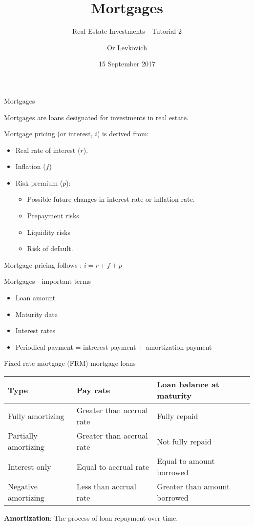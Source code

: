 \documentclass[ignorenonframetext,]{beamer}
\title{Mortgages}
\subtitle{Real-Estate Investments - Tutorial 2}
\author{Or Levkovich}
\date{15 September 2017}
\providecommand{\tightlist}{%
\setlength{\itemsep}{0pt}\setlength{\parskip}{0pt}}
\begin{document}
\frame{\titlepage}

\begin{frame}{Mortgages}

Mortgages are loans designated for investments in real estate.

Mortgage pricing (or interest, \(i\)) is derived from:

\begin{itemize}
\tightlist
\item
  Real rate of interest (\(r\)).
\item
  Inflation (\(f\))
\item
  Risk premium (\(p\)):

  \begin{itemize}
  \tightlist
  \item
    Possible future changes in interest rate or inflation rate.
  \item
    Prepayment risks.
  \item
    Liquidity risks
  \item
    Risk of default.
  \end{itemize}
\end{itemize}

Mortgage pricing follows : \(i = r + f + p\)

\end{frame}

\begin{frame}{Mortgages - important terms}

\begin{itemize}
\tightlist
\item
  Loan amount
\item
  Maturity date
\item
  Interest rates
\item
  Periodical payment = intrerest payment + amortization payment
\end{itemize}

\end{frame}

\begin{frame}{Fixed rate mortgage (FRM) mortgage loans}

\footnotesize

\begin{longtable}[]{@{}lll@{}}
\toprule
Type & Pay rate & Loan balance at maturity\tabularnewline
\midrule
\endhead
Fully amortizing & Greater than accrual rate & Fully
repaid\tabularnewline
Partially amortizing & Greater than accrual rate & Not fully
repaid\tabularnewline
Interest only & Equal to accrual rate & Equal to amount
borrowed\tabularnewline
Negative amortizing & Less than accrual rate & Greater than amount
borrowed\tabularnewline
\bottomrule
\end{longtable}

\textbf{Amortization}: The process of loan repayment over time.

\normalsize

\end{frame}
\end{document}
